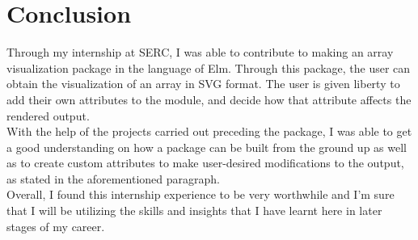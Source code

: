 \cleardoublepage

\section{Conclusion}
\begin{FlushLeft}
Through my internship at SERC, I was able to contribute to making an array visualization package in the language of Elm. Through this package, the user can obtain the visualization of an array in SVG format.
The user is given liberty to add their own attributes to the module, and decide how that attribute affects the rendered output.
\\[0.2in]
With the help of the projects carried out preceding the package, I was able to get a good understanding on how a package can be built from the ground up as well as to create custom attributes to make user-desired modifications to the output, as stated in the aforementioned paragraph. 
\\[0.2in]
Overall, I found this internship experience to be very worthwhile and I'm sure that I will be utilizing the skills and insights that I have learnt here in later stages of my career.
\end{FlushLeft}